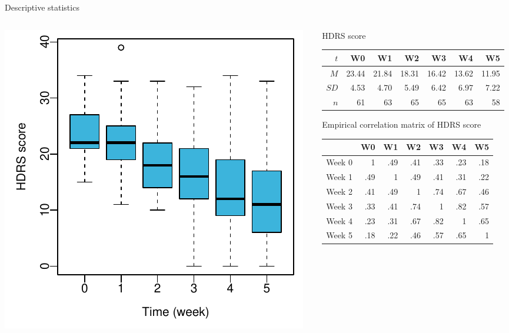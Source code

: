 \documentclass[aspectratio=169]{beamer}
\begin{document}
\begin{frame}{Descriptive statistics}
\begin{columns}
\begin{column}{.55\textwidth}
  \includegraphics[scale=.8]{fig/hdrs-box}
\end{column}
\begin{column}{.6\textwidth}
  HDRS score\\[1ex]
  {\footnotesize
\begin{tabular}{rrrrrrr}
  \hline
  $t$ & W0 & W1 & W2 & W3 & W4 & W5 \\ 
  \hline
  $M$  & 23.44 & 21.84 & 18.31 & 16.42 & 13.62 & 11.95 \\ 
  $SD$ &  4.53 & 4.70  & 5.49  & 6.42  & 6.97  & 7.22 \\ 
  $n$  & 61    & 63    & 65    & 65    & 63    & 58    \\ 
  \hline
\end{tabular}
  }

  \vspace{.5cm}
  Empirical correlation matrix of HDRS score\\[1ex]
  {\footnotesize
\begin{tabular}{rrrrrrr}
  \hline
   & W0 & W1 & W2 & W3 & W4 & W5 \\ 
  \hline
  Week 0 &   1 & .49 & .41 & .33 & .23 & .18 \\ 
  Week 1 & .49 &   1 & .49 & .41 & .31 & .22 \\ 
  Week 2 & .41 & .49 &   1 & .74 & .67 & .46 \\ 
  Week 3 & .33 & .41 & .74 &   1 & .82 & .57 \\ 
  Week 4 & .23 & .31 & .67 & .82 &   1 & .65 \\ 
  Week 5 & .18 & .22 & .46 & .57 & .65 &   1 \\ 
  \hline
\end{tabular}
  }


\end{column}
\end{columns}
\end{frame}
\end{document}
